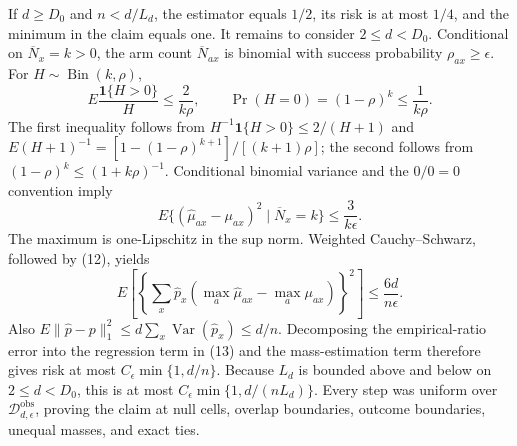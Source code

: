 If \(d\geq D_0\) and \(n<d/L_d\), the estimator equals \(1/2\), its risk is at most \(1/4\), and the minimum in the claim equals one.  It remains to consider \(2\leq d<D_0\).  Conditional on \(\overline N_x=k>0\), the arm count \(\overline N_{ax}\) is binomial with success probability \(\rho_{ax}\geq\epsilon\).  For \(H\sim\operatorname{Bin}(k,\rho)\),
\[
 E\frac{\mathbf1\{H>0\}}H\leq\frac2{k\rho},\qquad
 \Pr(H=0)=(1-\rho)^k\leq\frac1{k\rho}.                            \tag{11}
\]
The first inequality follows from \(H^{-1}\mathbf1\{H>0\}\leq2/(H+1)\) and
\(E(H+1)^{-1}=[1-(1-\rho)^{k+1}]/[(k+1)\rho]\); the second follows from \((1-\rho)^k\leq(1+k\rho)^{-1}\).  Conditional binomial variance and the \(0/0=0\) convention imply
\[
 E\{(\widehat\mu_{ax}-\mu_{ax})^2\mid\overline N_x=k\}
 \leq\frac3{k\epsilon}.                                            \tag{12}
\]
The maximum is one-Lipschitz in the sup norm.  Weighted Cauchy--Schwarz, followed by (12), yields
\[
 E\left[\left\{\sum_x\widehat p_x
 (\max_a\widehat\mu_{ax}-\max_a\mu_{ax})\right\}^2\right]
 \leq\frac{6d}{n\epsilon}.                                         \tag{13}
\]
Also \(E\lVert\widehat p-p\rVert_1^2\leq d\sum_x\operatorname{Var}(\widehat p_x)\leq d/n\).  Decomposing the empirical-ratio error into the regression term in (13) and the mass-estimation term therefore gives risk at most \(C_\epsilon\min\{1,d/n\}\).  Because \(L_d\) is bounded above and below on \(2\leq d<D_0\), this is at most \(C_\epsilon\min\{1,d/(nL_d)\}\).  Every step was uniform over \(\mathcal D_{d,\epsilon}^{\mathrm{obs}}\), proving the claim at null cells, overlap boundaries, outcome boundaries, unequal masses, and exact ties.